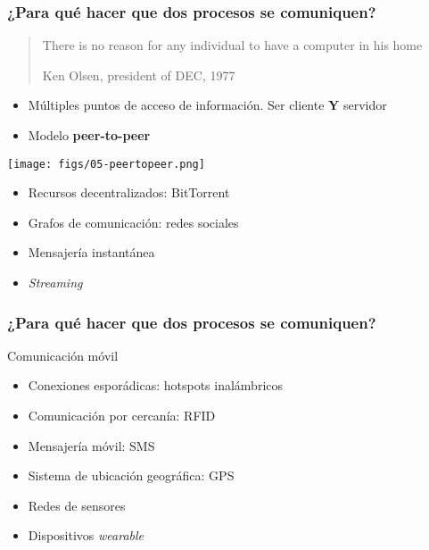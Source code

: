 \documentclass[letter]{beamer}
\begin{document}
\begin{frame}
  \frametitle{¿Para qué hacer que dos procesos se comuniquen?}

  \begin{quote}
    There is no reason for any individual to have a computer in his home
    \begin{flushright}Ken Olsen, president of DEC, 1977\end{flushright}
  \end{quote}

  \begin{itemize}
    \item Múltiples puntos de acceso de información. Ser cliente {\bf Y} servidor
    \item Modelo {\bf peer-to-peer}
  \end{itemize}
  \begin{center}
    \texttt{[image: figs/05-peertopeer.png]}
  \end{center}
  \begin{itemize}
    \item Recursos decentralizados: BitTorrent
    \item Grafos de comunicación: redes sociales
    \item Mensajería instantánea
    \item {\em Streaming}
  \end{itemize}

\end{frame}
\begin{frame}
  \frametitle{¿Para qué hacer que dos procesos se comuniquen?}

  Comunicación móvil
  \begin{itemize}
    \item<2-> Conexiones esporádicas: hotspots inalámbricos
    \item<3-> Comunicación por cercanía: RFID
    \item<4-> Mensajería móvil: SMS
    \item<5-> Sistema de ubicación geográfica: GPS
    \item<6-> Redes de sensores
    \item<7-> Dispositivos {\em wearable}
  \end{itemize}

\end{frame}
\end{document}

